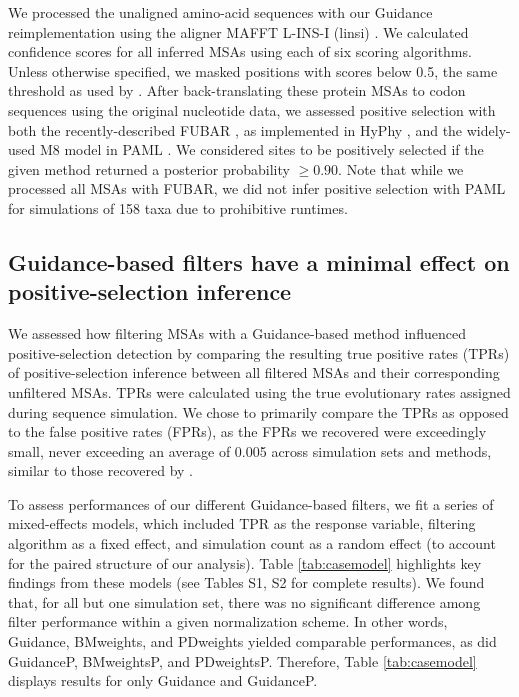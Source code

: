 \documentclass[11pt]{article}
\begin{document}
We processed the unaligned amino-acid sequences with our Guidance reimplementation using the aligner MAFFT L-INS-I (linsi) \citep{Katoh2005}. We calculated confidence scores for all inferred MSAs using each of six scoring algorithms. Unless otherwise specified, we masked positions with scores below 0.5, the same threshold as used by \citet{Jordan2012}. After back-translating these protein MSAs to codon sequences using the original nucleotide data, we assessed positive selection with both the recently-described FUBAR \citep{Murrell2013}, as implemented in HyPhy \citep{Pond2005}, and the widely-used M8 model in PAML \citep{Yang2007}. We considered sites to be positively selected if the given method returned a posterior probability $\geq0.90$. Note that while we processed all MSAs with FUBAR, we did not infer positive selection with PAML for simulations of 158 taxa due to prohibitive runtimes. 

\subsection*{Guidance-based filters have a minimal effect on positive-selection inference}

We assessed how filtering MSAs with a Guidance-based method influenced positive-selection detection by comparing the resulting true positive rates (TPRs) of positive-selection inference between all filtered MSAs and their corresponding unfiltered MSAs. TPRs were calculated using the true evolutionary rates assigned during sequence simulation. We chose to primarily compare the TPRs as opposed to the false positive rates (FPRs), as the FPRs we recovered were exceedingly small, never exceeding an average of 0.005 across simulation sets and methods, similar to those recovered by \citet{Jordan2012}. 

To assess performances of our different Guidance-based filters, we fit a series of mixed-effects models, which included TPR as the response variable, filtering algorithm as a fixed effect, and simulation count as a random effect (to account for the paired structure of our analysis). Table \ref{tab:casemodel} highlights key findings from these models (see Tables S1, S2 for complete results). We found that, for all but one simulation set, there was no significant difference among filter performance within a given normalization scheme. In other words, Guidance, BMweights, and PDweights yielded comparable performances, as did GuidanceP, BMweightsP, and PDweightsP. Therefore, Table \ref{tab:casemodel} displays results for only Guidance and GuidanceP. 
\end{document}
